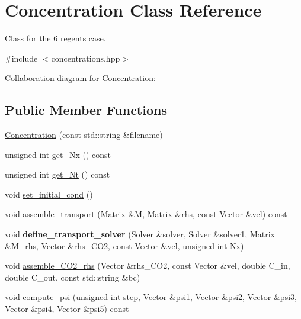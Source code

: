 \hypertarget{classConcentration}{}\section{Concentration Class Reference}
\label{classConcentration}


Class for the 6 regents case.  




{\ttfamily \#include $<$concentrations.\+hpp$>$}



Collaboration diagram for Concentration\+:
\subsection*{Public Member Functions}
\begin{DoxyCompactItemize}
\item 
\hyperlink{classConcentration_aacf470262d170239e4c69a3c728c3250}{Concentration} (const std\+::string \&filename)
\item 
unsigned int \hyperlink{classConcentration_aba844806c75ec258a0f2aeb8a4f94daa}{get\+\_\+\+Nx} () const
\item 
unsigned int \hyperlink{classConcentration_a1940fd79a1408f45782389c2b9be08ca}{get\+\_\+\+Nt} () const
\item 
void \hyperlink{classConcentration_ac214e0b8b1723da27b5ef9711bb5e5d9}{set\+\_\+initial\+\_\+cond} ()
\item 
void \hyperlink{classConcentration_a601757eb5beca6d3dca1deb1591f1c15}{assemble\+\_\+transport} (Matrix \&M, Matrix \&rhs, const Vector \&vel) const
\item 
\mbox{\label{classConcentration_a52f7d2a2c57e26d69d25e5a774334a13}} 
void {\bfseries define\+\_\+transport\+\_\+solver} (Solver \&solver, Solver \&solver1, Matrix \&M\+\_\+rhs, Vector \&rhs\+\_\+\+C\+O2, const Vector \&vel, unsigned int Nx)
\item 
void \hyperlink{classConcentration_a73fae4bed15fcf3c0296d7220c4f2e53}{assemble\+\_\+\+C\+O2\+\_\+rhs} (Vector \&rhs\+\_\+\+C\+O2, const Vector \&vel, double C\+\_\+in, double C\+\_\+out, const std\+::string \&bc)
\item 
void \hyperlink{classConcentration_ab00a6f7838bebf7cddaedbab247192b7}{compute\+\_\+psi} (unsigned int step, Vector \&psi1, Vector \&psi2, Vector \&psi3, Vector \&psi4, Vector \&psi5) const
\item 

\end{DoxyCompactItemize}
